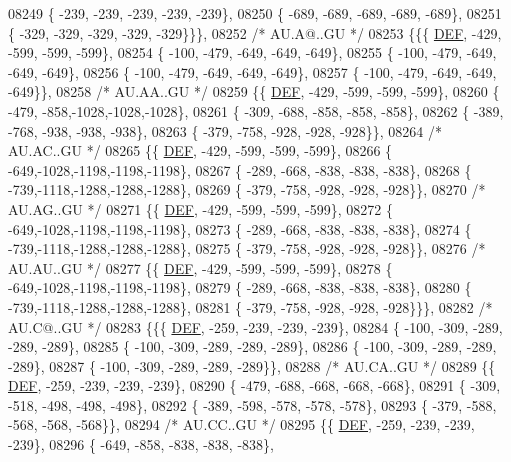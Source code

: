 \begin{DoxyCode}
08249 \{ -239, -239, -239, -239, -239\},
08250 \{ -689, -689, -689, -689, -689\},
08251 \{ -329, -329, -329, -329, -329\}\}\},
08252 \textcolor{comment}{/* AU.A@..GU */}
08253 \{\{\{  \mbox{\hyperlink{1_88_84__epars_8h_a397419fc12b37ed479c8abb9d444d843}{DEF}}, -429, -599, -599, -599\},
08254 \{ -100, -479, -649, -649, -649\},
08255 \{ -100, -479, -649, -649, -649\},
08256 \{ -100, -479, -649, -649, -649\},
08257 \{ -100, -479, -649, -649, -649\}\},
08258 \textcolor{comment}{/* AU.AA..GU */}
08259 \{\{  \mbox{\hyperlink{1_88_84__epars_8h_a397419fc12b37ed479c8abb9d444d843}{DEF}}, -429, -599, -599, -599\},
08260 \{ -479, -858,-1028,-1028,-1028\},
08261 \{ -309, -688, -858, -858, -858\},
08262 \{ -389, -768, -938, -938, -938\},
08263 \{ -379, -758, -928, -928, -928\}\},
08264 \textcolor{comment}{/* AU.AC..GU */}
08265 \{\{  \mbox{\hyperlink{1_88_84__epars_8h_a397419fc12b37ed479c8abb9d444d843}{DEF}}, -429, -599, -599, -599\},
08266 \{ -649,-1028,-1198,-1198,-1198\},
08267 \{ -289, -668, -838, -838, -838\},
08268 \{ -739,-1118,-1288,-1288,-1288\},
08269 \{ -379, -758, -928, -928, -928\}\},
08270 \textcolor{comment}{/* AU.AG..GU */}
08271 \{\{  \mbox{\hyperlink{1_88_84__epars_8h_a397419fc12b37ed479c8abb9d444d843}{DEF}}, -429, -599, -599, -599\},
08272 \{ -649,-1028,-1198,-1198,-1198\},
08273 \{ -289, -668, -838, -838, -838\},
08274 \{ -739,-1118,-1288,-1288,-1288\},
08275 \{ -379, -758, -928, -928, -928\}\},
08276 \textcolor{comment}{/* AU.AU..GU */}
08277 \{\{  \mbox{\hyperlink{1_88_84__epars_8h_a397419fc12b37ed479c8abb9d444d843}{DEF}}, -429, -599, -599, -599\},
08278 \{ -649,-1028,-1198,-1198,-1198\},
08279 \{ -289, -668, -838, -838, -838\},
08280 \{ -739,-1118,-1288,-1288,-1288\},
08281 \{ -379, -758, -928, -928, -928\}\}\},
08282 \textcolor{comment}{/* AU.C@..GU */}
08283 \{\{\{  \mbox{\hyperlink{1_88_84__epars_8h_a397419fc12b37ed479c8abb9d444d843}{DEF}}, -259, -239, -239, -239\},
08284 \{ -100, -309, -289, -289, -289\},
08285 \{ -100, -309, -289, -289, -289\},
08286 \{ -100, -309, -289, -289, -289\},
08287 \{ -100, -309, -289, -289, -289\}\},
08288 \textcolor{comment}{/* AU.CA..GU */}
08289 \{\{  \mbox{\hyperlink{1_88_84__epars_8h_a397419fc12b37ed479c8abb9d444d843}{DEF}}, -259, -239, -239, -239\},
08290 \{ -479, -688, -668, -668, -668\},
08291 \{ -309, -518, -498, -498, -498\},
08292 \{ -389, -598, -578, -578, -578\},
08293 \{ -379, -588, -568, -568, -568\}\},
08294 \textcolor{comment}{/* AU.CC..GU */}
08295 \{\{  \mbox{\hyperlink{1_88_84__epars_8h_a397419fc12b37ed479c8abb9d444d843}{DEF}}, -259, -239, -239, -239\},
08296 \{ -649, -858, -838, -838, -838\},

\end{DoxyCode}
